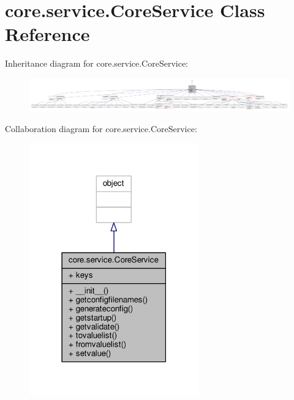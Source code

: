 \hypertarget{classcore_1_1service_1_1_core_service}{\section{core.\+service.\+Core\+Service Class Reference}
\label{classcore_1_1service_1_1_core_service}
}


Inheritance diagram for core.\+service.\+Core\+Service\+:
\nopagebreak
\begin{figure}[H]
\begin{center}
\leavevmode
\includegraphics[width=350pt]{classcore_1_1service_1_1_core_service__inherit__graph}
\end{center}
\end{figure}


Collaboration diagram for core.\+service.\+Core\+Service\+:
\nopagebreak
\begin{figure}[H]
\begin{center}
\leavevmode
\includegraphics[width=207pt]{classcore_1_1service_1_1_core_service__coll__graph}
\end{center}
\end{figure}
